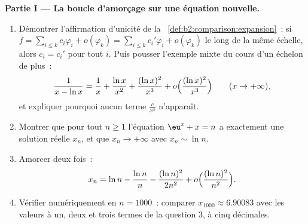 \begin{problem}
\label{pb:b2:comparison:1}

\medskip
\noindent\textbf{Partie I --- La boucle d'amorçage sur une équation
nouvelle.}
\begin{enumerate}
  \item Démontrer l'affirmation d'unicité de la~%
        \cref{def:b2:comparison:expansion}~: si $f = \sum_{i\leq
        k} c_i\varphi_i + o(\varphi_k) = \sum_{i \leq k}
        c_i'\varphi_i + o(\varphi_k)$ le long de la même échelle, alors
        $c_i = c_i'$ pour tout $i$. Puis pousser l'exemple mixte du
        cours d'un échelon de plus~:
        \[
        \frac{1}{x - \ln x} = \frac1x + \frac{\ln x}{x^2} +
        \frac{(\ln x)^2}{x^3} + o\Bigl(\frac{(\ln
        x)^2}{x^3}\Bigr) \qquad (x \to +\infty),
        \]
        et expliquer pourquoi aucun terme $\frac{c}{x^2}$ n'apparaît.
  \item Montrer que pour tout $n \geq 1$ l'équation $\eu^x + x =
        n$ a exactement une solution réelle $x_n$, et que $x_n
        \to +\infty$ avec $x_n \sim \ln n$.
  \item Amorcer deux fois~:
        \[
        x_n = \ln n - \frac{\ln n}{n} - \frac{(\ln n)^2}{2n^2} +
        o\Bigl(\frac{(\ln n)^2}{n^2}\Bigr).
        \]
  \item Vérifier numériquement en $n = 1000$~: comparer $x_{1000}
        \approx 6.90083$ avec les valeurs à un, deux et trois termes
        de la question 3, à cinq décimales.
\end{enumerate}


\end{problem}
